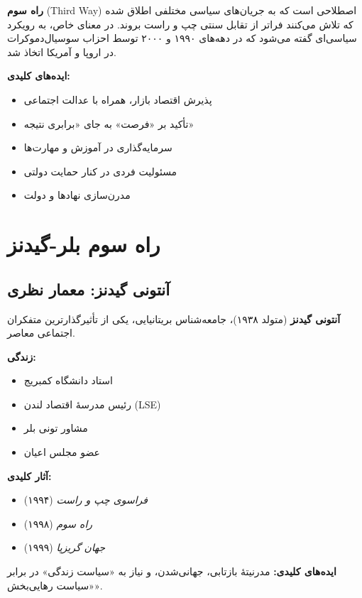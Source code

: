 \begin{tcolorbox}[
    enhanced,
    colback=rightblue!8,
    colframe=rightblue,
    boxrule=1.5pt,
    arc=5pt,
    fonttitle=\bfseries,
    title={\rl{🔵 تعریف کلیدی: راه سوم}}
]
\textbf{راه سوم} (Third Way) اصطلاحی است که به جریان‌های سیاسی مختلفی اطلاق شده که تلاش می‌کنند فراتر از تقابل سنتی چپ و راست بروند. در معنای خاص، به رویکرد سیاسی‌ای گفته می‌شود که در دهه‌های ۱۹۹۰ و ۲۰۰۰ توسط احزاب سوسیال‌دموکرات در اروپا و آمریکا اتخاذ شد.

\textbf{ایده‌های کلیدی:}
\begin{itemize}
    \item پذیرش اقتصاد بازار، همراه با عدالت اجتماعی
    \item تأکید بر «فرصت» به جای «برابری نتیجه»
    \item سرمایه‌گذاری در آموزش و مهارت‌ها
    \item مسئولیت فردی در کنار حمایت دولتی
    \item مدرن‌سازی نهادها و دولت
\end{itemize}
\end{tcolorbox}

\section{راه سوم بلر-گیدنز}

\subsection{آنتونی گیدنز: معمار نظری}

\begin{tcolorbox}[
    enhanced,
    colback=gray!5,
    colframe=darkgray,
    boxrule=2pt,
    arc=10pt,
    shadow={2mm}{-2mm}{0mm}{black!30},
    fonttitle=\bfseries\large,
    title={\rl{👤 پرترهٔ متفکر: آنتونی گیدنز}}
]

\textbf{آنتونی گیدنز} (متولد ۱۹۳۸)، جامعه‌شناس بریتانیایی، یکی از تأثیرگذارترین متفکران اجتماعی معاصر.

\textbf{زندگی:}
\begin{itemize}
    \item استاد دانشگاه کمبریج
    \item رئیس مدرسهٔ اقتصاد لندن (LSE)
    \item مشاور تونی بلر
    \item عضو مجلس اعیان
\end{itemize}



\textbf{آثار کلیدی:}
\begin{itemize}
    \item \textit{فراسوی چپ و راست} (۱۹۹۴)
    \item \textit{راه سوم} (۱۹۹۸)
    \item \textit{جهان گریزپا} (۱۹۹۹)
\end{itemize}

\textbf{ایده‌های کلیدی:}
مدرنیتهٔ بازتابی، جهانی‌شدن، و نیاز به «سیاست زندگی» در برابر «سیاست رهایی‌بخش».

\end{tcolorbox}


